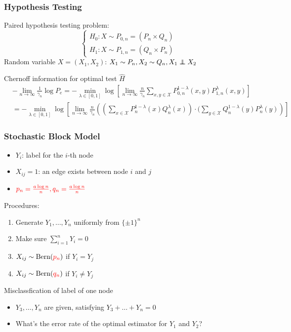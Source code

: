 \documentclass{beamer}
\DeclareMathOperator{\Bern}{Bern}
\newcommand\independent{\protect\mathpalette{\protect\independenT}{\perp}}
\def\independenT#1#2{\mathrel{\rlap{$#1#2$}\mkern2mu{#1#2}}}
\begin{document}
\begin{frame}\frametitle{Hypothesis Testing}
Paired hypothesis testing problem:
\begin{equation*}
\begin{cases}
H_0: X \sim P_{0,n}=(P_n \times Q_n)\\
H_1: X \sim P_{1,n}=(Q_n \times P_n)
\end{cases}
\end{equation*}
Random variable $X=(X_1, X_2)$: $X_1 \sim P_n, X_2 \sim Q_n, X_1 \independent X_2$

Chernoff information for optimal test $\widehat{H}$
\begin{align*}
&-\lim_{n\to\infty} \frac{1}{\gamma_n}\log P_e = -\min_{\lambda \in [0,1]}
\log[\lim_{n\to\infty}\frac{n}{\gamma_n} \sum_{x,y\in \mathcal{X}}
P^{1-\lambda}_{0,n}(x,y) P^{\lambda}_{1,n}(x,y) ] \\
&=  -\min_{\lambda \in [0,1]}
\log[\lim_{n\to\infty}\frac{n}{\gamma_n} \left((\sum_{x\in \mathcal{X}}
P^{1-\lambda}_{n}(x) Q^{\lambda}_{n}(x)) \cdot
(\sum_{y\in \mathcal{X}}
Q^{1-\lambda}_{n}(y) P^{\lambda}_{n}(y)\right) ]
\end{align*}
\end{frame}
\begin{frame}
\frametitle{
Stochastic Block Model}
\begin{itemize}
\item $Y_i$: label for the $i$-th node
\item $X_{ij}=1$: an edge exists between node $i$ and $j$
\item $\color{red}  p_n=\frac{a \log n}{n}, q_n =\frac{a \log n}{n} $
\end{itemize}
Procedures:
\begin{enumerate}
\item Generate $Y_1, \dots, Y_n$ uniformly from $\{\pm 1\}^n$
\item Make sure $\sum_{i=1}^n Y_i = 0$
\item $X_{ij} \sim \Bern(\textcolor{red} {p_n} ) $ if $Y_i=Y_j$
\item $X_{ij} \sim \Bern(\textcolor{red}{q_n} ) $ if $Y_i \neq Y_j$
\end{enumerate}
Misclassfication of label of one node
\begin{itemize}
\item $Y_3, \dots, Y_n$ are given, satisfying $Y_3 + \dots + Y_n  = 0$
\item What's the error rate of the optimal estimator for $Y_1$ and $Y_2$?
\end{itemize}
\end{frame}
\end{document}
